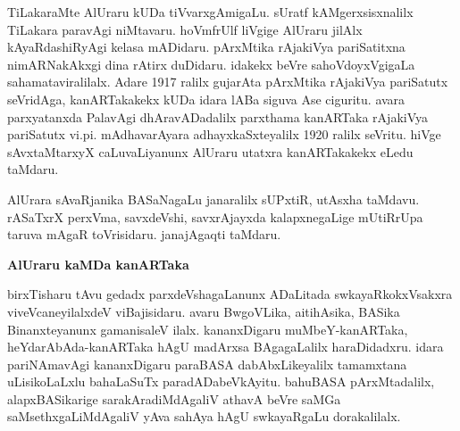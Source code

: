 \documentclass[11pt,a4size]{article}
\begin{document}
TiLakaraMte AlUraru kUDa tiVvarxgAmigaLu. sUratf kAMgerxsisxnalilx
TiLakara paravAgi niMtavaru. hoVmfrUlf liVgige AlUraru jilAlx
kAyaRdashiRyAgi kelasa mADidaru. pArxMtika rAjakiVya pariSatitxna
nimARNakAkxgi dina rAtirx duDidaru. idakekx beVre sahoVdoyxVgigaLa
sahamataviralilalx. Adare 1917 ralilx gujarAta pArxMtika rAjakiVya
pariSatutx seVridAga, kanARTakakekx kUDa idara lABa siguva Ase
ciguritu. avara parxyatanxda PalavAgi dhAravADadalilx parxthama
kanARTaka rAjakiVya pariSatutx vi.pi. mAdhavarAyara adhayxkaSxteyalilx
1920 ralilx seVritu. hiVge sAvxtaMtarxyX caLuvaLiyanunx AlUraru
utatxra kanARTakakekx eLedu taMdaru.

AlUrara sAvaRjanika BASaNagaLu janaralilx sUPxtiR, utAsxha
taMdavu. rASaTxrX perxVma, savxdeVshi, savxrAjayxda kalapxnegaLige
mUtiRrUpa taruva mAgaR toVrisidaru. janajAgaqti taMdaru.

\bigskip
\centerline{\textbf{\Large{AlUraru kaMDa kanARTaka}}}
\medskip

birxTisharu tAvu gedadx parxdeVshagaLanunx ADaLitada
swkayaRkokxVsakxra viveVcaneyilalxdeV viBajisidaru. avaru BwgoVLika,
aitihAsika, BASika Binanxteyanunx gamanisaleV ilalx. kananxDigaru
muMbeY-kanARTaka, heYdarAbAda-kanARTaka hAgU madArxsa BAgagaLalilx
haraDidadxru. idara pariNAmavAgi kananxDigaru paraBASA
dabAbxLikeyalilx tamamxtana uLisikoLaLxlu bahaLaSuTx
paradADabeVkAyitu. bahuBASA pArxMtadalilx, alapxBASikarige
sarakAradiMdAgaliV athavA beVre saMGa saMsethxgaLiMdAgaliV yAva sahAya
hAgU swkayaRgaLu dorakalilalx.
\end{document}

